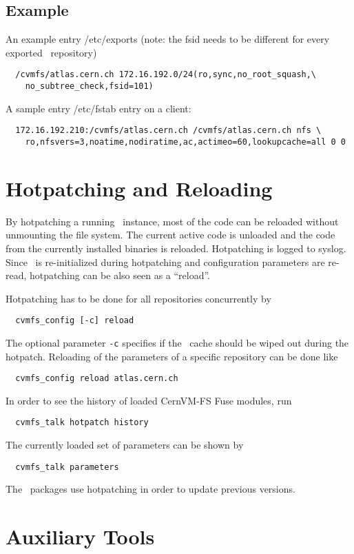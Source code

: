 \subsection{Example}
An example entry /etc/exports (note: the fsid needs to be different for every exported \cvmfs\ repository)
\begin{verbatim}
  /cvmfs/atlas.cern.ch 172.16.192.0/24(ro,sync,no_root_squash,\
    no_subtree_check,fsid=101)
\end{verbatim}
A sample entry /etc/fstab entry on a client:
\begin{verbatim}
  172.16.192.210:/cvmfs/atlas.cern.ch /cvmfs/atlas.cern.ch nfs \
    ro,nfsvers=3,noatime,nodiratime,ac,actimeo=60,lookupcache=all 0 0
\end{verbatim}


\section{Hotpatching and Reloading}
\label{sct:hotpatch}

By hotpatching a running \cvmfs\ instance, most of the code can be reloaded without unmounting the file system.
The current active code is unloaded and the code from the currently installed binaries is reloaded.
Hotpatching is logged to syslog.
Since \cvmfs\ is re-initialized during hotpatching and configuration parameters are re-read, hotpatching can be also seen as a ``reload''.

Hotpatching has to be done for all repositories concurrently by
\begin{verbatim}
  cvmfs_config [-c] reload
\end{verbatim}
The optional parameter \texttt{-c} specifies if the \cvmfs\ cache should be wiped out during the hotpatch.
Reloading of the parameters of a specific repository can be done like
\begin{verbatim}
  cvmfs_config reload atlas.cern.ch
\end{verbatim}
In order to see the history of loaded CernVM-FS Fuse modules, run
\begin{verbatim}
  cvmfs_talk hotpatch history
\end{verbatim}
The currently loaded set of parameters can be shown by
\begin{verbatim}
  cvmfs_talk parameters
\end{verbatim}
The \cvmfs\ packages use hotpatching in order to update previous versions.


\section{Auxiliary Tools}
\label{sct:tools}

